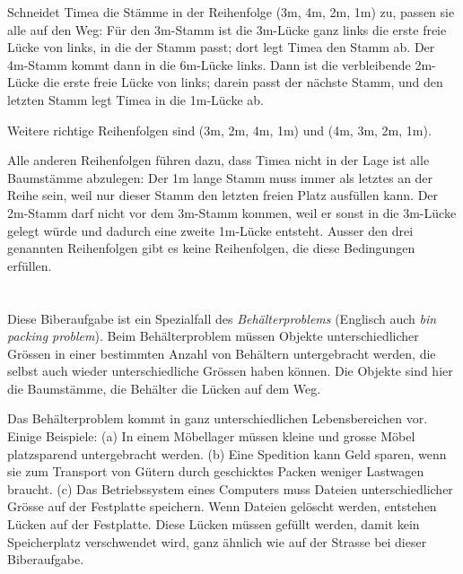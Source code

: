{{{\centering%
\par}

Schneidet Timea die Stämme in der Reihenfolge (3\thinspace{}m, 4\thinspace{}m, 2\thinspace{}m, 1\thinspace{}m) zu, passen sie alle auf den Weg: Für den 3\thinspace{}m-Stamm ist die 3\thinspace{}m-Lücke ganz links die erste  freie Lücke von links, in die der Stamm passt; dort legt Timea den Stamm ab. Der 4\thinspace{}m-Stamm kommt dann in die 6\thinspace{}m-Lücke links. Dann ist die verbleibende 2\thinspace{}m-Lücke die erste freie Lücke von links; darein passt der nächste Stamm, und den letzten Stamm legt Timea in die 1\thinspace{}m-Lücke ab.

Weitere richtige Reihenfolgen sind (3\thinspace{}m, 2\thinspace{}m, 4\thinspace{}m, 1\thinspace{}m) und (4\thinspace{}m, 3\thinspace{}m, 2\thinspace{}m, 1\thinspace{}m).

Alle anderen Reihenfolgen führen dazu, dass Timea nicht in der Lage ist alle Baumstämme abzulegen: Der 1\thinspace{}m lange Stamm muss immer als letztes an der Reihe sein, weil nur dieser Stamm den letzten freien Platz ausfüllen kann. Der 2\thinspace{}m-Stamm darf nicht vor dem 3\thinspace{}m-Stamm kommen, weil er sonst in die 3\thinspace{}m-Lücke gelegt würde und dadurch eine zweite 1\thinspace{}m-Lücke entsteht. Ausser den drei genannten Reihenfolgen gibt es keine Reihenfolgen, die diese Bedingungen erfüllen.



\section*{\BrochureItsInformatics}
Diese Biberaufgabe ist ein Spezialfall des \emph{Behälterproblems} (Englisch auch \emph{bin packing problem}). Beim Behälterproblem müssen Objekte unterschiedlicher Grössen in einer bestimmten Anzahl von Behältern untergebracht werden, die selbst auch wieder unterschiedliche Grössen haben können. Die Objekte sind hier die Baumstämme, die Behälter die Lücken auf dem Weg.

Das Behälterproblem kommt in ganz unterschiedlichen Lebensbereichen vor. Einige Beispiele: (a) In einem Möbellager müssen kleine und grosse Möbel platzsparend untergebracht werden. (b) Eine Spedition kann Geld sparen, wenn sie zum Transport von Gütern durch geschicktes Packen weniger Lastwagen braucht. (c) Das Betriebssystem eines Computers muss Dateien unterschiedlicher Grösse auf der Festplatte speichern. Wenn Dateien gelöscht werden, entstehen Lücken auf der Festplatte. Diese Lücken müssen gefüllt werden, damit kein Speicherplatz verschwendet wird, ganz ähnlich wie auf der Strasse bei dieser Biberaufgabe.

}}
